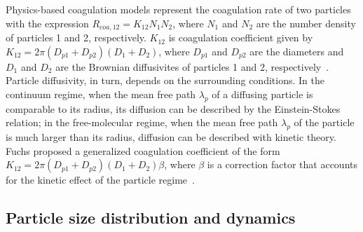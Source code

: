 \documentclass[preprint,12pt,letterpaper]{elsarticle}
\begin{document}
Physics-based coagulation models represent the coagulation rate of two particles with the expression $R_{coa,12}=K_{12}N_1N_2$, where $N_1$ and $N_2$ are the number density of particles 1 and 2, respectively. $K_{12}$ is coagulation coefficient given by $K_{12}=2\pi (D_{p1}+D_{p2})(D_1+D_2)$, where $D_{p1}$ and $D_{p2}$ are the diameters and $D_1$ and $D_2$ are the Brownian diffusivites of particles 1 and 2, respectively~\cite{Seinfeld_2016}. Particle diffusivity, in turn, depends on the surrounding conditions. In the continuum regime, when the mean free path $\lambda_p$ of a diffusing particle is comparable to its radius, its diffusion can be described by the Einstein-Stokes relation; in the free-molecular regime, when the mean free path $\lambda_p$ of the particle is much larger than its radius, diffusion can be described with kinetic theory. Fuchs proposed a generalized coagulation coefficient of the form $K_{12}=2\pi (D_{p1}+D_{p2})(D_1+D_2)\beta$, where $\beta$ is a correction factor that accounts for the kinetic effect of the particle regime~\cite{Fuchs_1964, Seinfeld_2016}.

\subsection{Particle size distribution and dynamics}
\label{ss:PSD_dynamics}



\begin{table}
    \caption{Summary of soot particle size distribution models implemented in SootLib.}
    \label{t:psd_models}
    \centering
\end{table}
\end{document}
